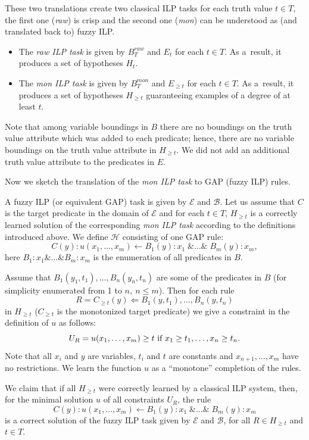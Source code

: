 These two translations create two classical ILP tasks for each truth value $t\in T$, the first one (\emph{raw}) is crisp and the second one (\emph{mon}) can be understood as (and translated back to) fuzzy ILP.

\begin{itemize}
	\item The \textit{raw ILP task} is given by $B^{raw}_{T}$ and $E_t$ for each $t\in T$.  As a~result, it produces a set of hypotheses $H_t$.

	\item The \textit{mon ILP task} is given by ${B}^{mon}_T$ and $E_{\ge t}$ for each $t\in T$. As a~result, it produces a set of hypotheses $H_{\ge t}$ guaranteeing examples of a degree of at least $t$.
\end{itemize}

Note that among variable boundings in $B$ there are no boundings on the truth value attribute which was added to each predicate; hence, there are no variable boundings on the truth value attribute in $H_{\ge t}$. We did not add an additional truth value attribute to the predicates in $E$. 

Now we sketch the translation of the \emph{mon ILP task} to GAP (fuzzy ILP) rules. 

\begin{theorem}
A fuzzy ILP (or equivalent GAP) task is given by ${\mathcal E}$ and ${\mathcal B}$. Let us assume that $C$ is the target predicate in the domain of ${\mathcal E}$ and for each $t \in T$, $H_{\ge t}$ is a correctly learned solution of the corresponding \textit{mon ILP task} according to the definitions introduced above. We define ${\mathcal H}$ consisting of one GAP rule:
$$C(y):u(x_1,\dots,x_m)\leftarrow B_1(y):x_1\; \&\dots\& \;B_m(y):x_m,$$
here $B_1:x_1 \&\dots\& B_m:x_m$ is the enumeration of all predicates in $B$.

Assume that $B_1(y_1,t_1),\dots,B_n(y_n,t_n)$ are some of the predicates in $B$ (for simplicity enumerated from 1 to $n, \ n \le m$). Then for each rule 
$$
R=C_{\ge t}(y)\Leftarrow B_1(y,t_1),\dots,B_n(y,t_n)
$$
in $H_{\ge t}$ ($C_{\ge t}$ is the monotonized target predicate) we give a constraint in the definition of $u$ as follows:
$$
U_R=u(x_1,\dots,x_m)\ge t \hbox{ if }x_1\ge t_1,\dots,x_n\ge t_n.
$$
Note that all $x_i$ and $y$ are variables, $t_i$ and $t$ are constants and $x_{n+1},\dots,x_m$ have no restrictions.
We learn the function $u$ as a ``monotone'' completion of the rules. 

We claim that if all $H_{\ge t}$ were correctly learned by a classical ILP system, then, for the minimal solution $u$ of all constraints $U_R$, the rule
$$
C(y):u(x_1,\dots,x_m)\leftarrow B_1(y):x_1\; \&\dots\& \;B_m(y):x_m
$$
is a correct solution of the fuzzy ILP task given by ${\mathcal E}$ and ${\mathcal B}$, for all $R\in H_{\ge t}$ and $t\in T$. 
\end{theorem}

